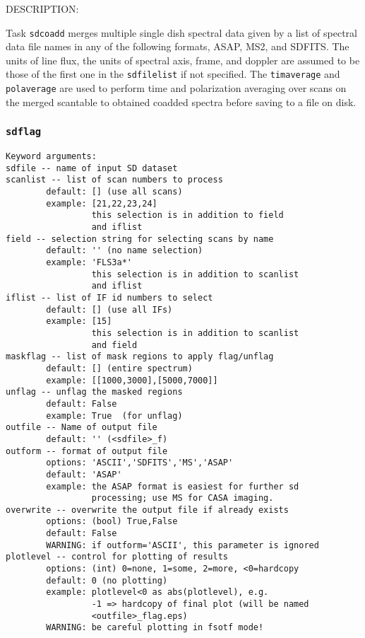           DESCRIPTION:

          Task {\tt sdcoadd} merges multiple single dish spectral data given by
          a list of spectral data file names in any of the following formats,
          ASAP, MS2, and SDFITS.
          The units of line flux, the units of spectral axis, frame, and doppler
          are assumed to be those of the first one in the {\tt sdfilelist} if not
          specified.
          The {\tt timaverage} and {\tt polaverage} are used to perform time
          and polarization averaging over scans on the merged scantable to 
          obtained coadded spectra before saving to a file on disk.


\subsubsection{{\tt sdflag}}
\label{section:sd.sdtasks.tasks.sdflag}

\begin{verbatim}
Keyword arguments:
sdfile -- name of input SD dataset
scanlist -- list of scan numbers to process
        default: [] (use all scans)
        example: [21,22,23,24]
                 this selection is in addition to field
                 and iflist
field -- selection string for selecting scans by name
        default: '' (no name selection)
        example: 'FLS3a*'
                 this selection is in addition to scanlist
                 and iflist
iflist -- list of IF id numbers to select
        default: [] (use all IFs)
        example: [15]
                 this selection is in addition to scanlist
                 and field
maskflag -- list of mask regions to apply flag/unflag
        default: [] (entire spectrum)
        example: [[1000,3000],[5000,7000]]
unflag -- unflag the masked regions
        default: False
        example: True  (for unflag)
outfile -- Name of output file
        default: '' (<sdfile>_f)
outform -- format of output file
        options: 'ASCII','SDFITS','MS','ASAP'
        default: 'ASAP'
        example: the ASAP format is easiest for further sd
                 processing; use MS for CASA imaging.
overwrite -- overwrite the output file if already exists
        options: (bool) True,False
        default: False
        WARNING: if outform='ASCII', this parameter is ignored
plotlevel -- control for plotting of results
        options: (int) 0=none, 1=some, 2=more, <0=hardcopy
        default: 0 (no plotting)
        example: plotlevel<0 as abs(plotlevel), e.g.
                 -1 => hardcopy of final plot (will be named
                 <outfile>_flag.eps)
        WARNING: be careful plotting in fsotf mode!
\end{verbatim}

